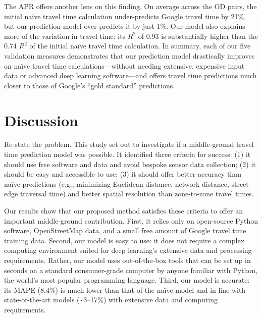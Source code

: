 \documentclass[12pt,letterpaper]{article} %
\begin{document}
The APR offers another lens on this finding. On average across the OD pairs, the initial naïve travel time calculation under-predicts Google travel time by 21\%, but our prediction model over-predicts it by just 1\%. Our model also explains more of the variation in travel time: its $R^2$ of 0.93 is substantially higher than the 0.74 $R^2$ of the initial naïve travel time calculation. In summary, each of our five validation measures demonstrates that our prediction model drastically improves on naïve travel time calculations---without needing extensive, expensive input data or advanced deep learning software---and offers travel time predictions much closer to those of Google's \enquote{gold standard} predictions.

\section{Discussion}

Re-state the problem. This study set out to investigate if a middle-ground travel time prediction model was possible. It identified three criteria for success: (1) it should use free software and data and avoid bespoke sensor data collection; (2) it should be easy and accessible to use; (3) it should offer better accuracy than naïve predictions (e.g., minimizing Euclidean distance, network distance, street edge traversal time) and better spatial resolution than zone-to-zone travel times.

Our results show that our proposed method satisfies these criteria to offer an important middle-ground contribution. First, it relies only on open-source Python software, OpenStreetMap data, and a small free amount of Google travel time training data. Second, our model is easy to use: it does not require a complex computing environment suited for deep learning's extensive data and processing requirements. Rather, our model uses out-of-the-box tools that can be set up in seconds on a standard consumer-grade computer by anyone familiar with Python, the world's most popular programming language. Third, our model is accurate: its MAPE (8.4\%) is much lower than that of the naïve model and in line with state-of-the-art models (\textasciitilde3--17\%) with extensive data and computing requirements.
\end{document}
